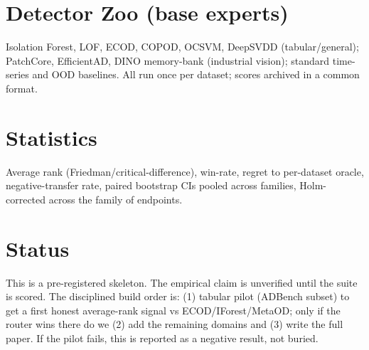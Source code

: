 \documentclass[11pt]{article}
\begin{document}
\section{Detector Zoo (base experts)}
Isolation Forest, LOF, ECOD, COPOD, OCSVM, DeepSVDD (tabular/general);
PatchCore, EfficientAD, DINO memory-bank (industrial vision); standard
time-series and OOD baselines. All run once per dataset; scores archived in a
common format.

\section{Statistics}
Average rank (Friedman/critical-difference), win-rate, regret to per-dataset
oracle, negative-transfer rate, paired bootstrap CIs pooled across families,
Holm-corrected across the family of endpoints.

\section{Status}
This is a pre-registered skeleton. The empirical claim is unverified until the
suite is scored. The disciplined build order is: (1) tabular pilot (ADBench
subset) to get a first honest average-rank signal vs ECOD/IForest/MetaOD; only if
the router wins there do we (2) add the remaining domains and (3) write the full
paper. If the pilot fails, this is reported as a negative result, not buried.
\end{document}

